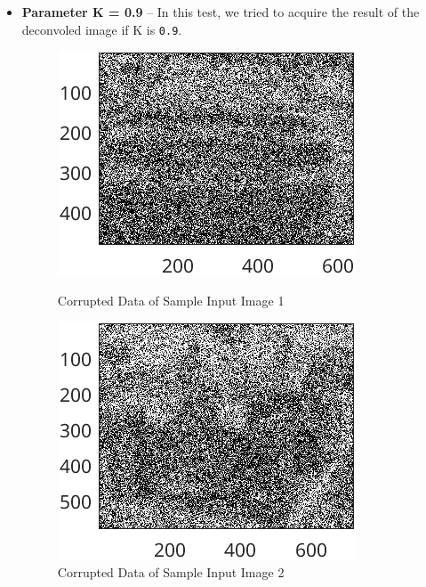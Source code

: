 \documentclass{article}
\begin{document}
\begin{itemize}
  	\item \textbf{Parameter K = 0.9} – In this test, we tried to acquire the result of the deconvoled image if K is {\texttt{0.9}}.

  		\begin{figure}[ht]
  			\centering
  			\begin{minipage}[t]{0.45\textwidth}
    			\centering
    			\includegraphics[width=\textwidth]{2AE1Corrupted2}
    			\caption{Corrupted Data of Sample Input Image 1}
    			\label{fig:corrupted_e1}
  			\end{minipage}\hfill
  			\begin{minipage}[t]{0.45\textwidth}
    			\centering
    			\includegraphics[width=\textwidth]{2AE2Corrupted2}
    			\caption{Corrupted Data of Sample Input Image 2}
    			\label{fig:corrupted_e2}
  			\end{minipage}
			\end{figure}


\end{itemize}
\end{document}
